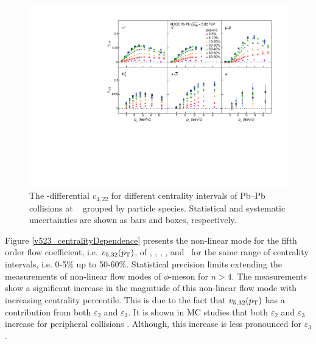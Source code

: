 \begin{figure}[!htb]
\begin{center}
\includegraphics[scale=0.82]{figures/results/All_v422_gap00_CentDep_PID2.pdf}
\end{center}
\caption{The \pT-differential $v_{4,22}$ for different centrality intervals of Pb--Pb collisions at \sNN~ grouped by particle species. Statistical and systematic uncertainties are shown as bars and boxes, respectively.}
\label{v422_centralityDependence}
\end{figure}
 
Figure \ref{v523_centralityDependence} presents the non-linear mode for the fifth order flow coefficient, i.e. $v_{5,32}(p_{\rm{T}})$, of \pion, \kaon, \Ks, \proton, and \lambdas~for the same range of centrality intervals, i.e. 0-5\% up to 50-60\%. Statistical precision limits extending the measurements of non-linear flow modes of $\phi$-meson for $n>4$. The measurements show a significant increase in the magnitude of this non-linear flow mode with increasing centrality percentile. This is due to the fact that $v_{5,32}(p_{\rm{T}})$ has a contribution from both $\varepsilon_{2}$ and $\varepsilon_{3}$. It is shown in MC studies that both $\varepsilon_{2}$ and $\varepsilon_{3}$ increase for peripheral collisions \cite{Alver:2010gr}. Although, this increase is less pronounced for $\varepsilon_{3}$.

